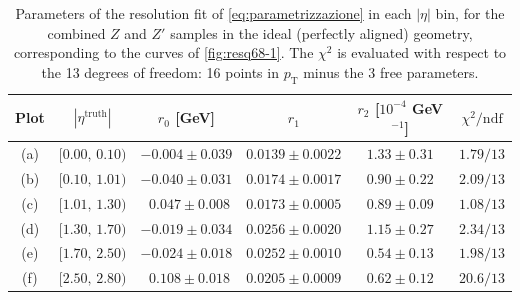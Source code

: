 \documentclass[11pt,a4paper,twoside,openright]{report}
\begin{document}
\begin{table}[htbp]
    \centering
    \begin{tabular}{c c c c c c}
        \toprule
        Plot & $|\eta^{\mathrm{truth}}|$ & $r_0$ [GeV] & $r_1$ & $r_2$ [$10^{-4}$ GeV$^{-1}$] & $\chi^2/\mathrm{ndf}$ \\
        \midrule
        (a) & $[0.00,\,0.10)$ & $-0.004 \pm 0.039$ & $0.0139 \pm 0.0022$ & $1.33 \pm 0.31$ & $1.79/13$ \\
        (b) & $[0.10,\,1.01)$ & $-0.040 \pm 0.031$ & $0.0174 \pm 0.0017$ & $0.90 \pm 0.22$ & $2.09/13$ \\
        (c) & $[1.01,\,1.30)$ & $\ \ 0.047 \pm 0.008$ & $0.0173 \pm 0.0005$ & $0.89 \pm 0.09$ & $1.08/13$ \\
        (d) & $[1.30,\,1.70)$ & $-0.019 \pm 0.034$ & $0.0256 \pm 0.0020$ & $1.15 \pm 0.27$ & $2.34/13$ \\
        (e) & $[1.70,\,2.50)$ & $-0.024 \pm 0.018$ & $0.0252 \pm 0.0010$ & $0.54 \pm 0.13$ & $1.98/13$ \\
        (f) & $[2.50,\,2.80)$ & $\ \ 0.108 \pm 0.018$ & $0.0205 \pm 0.0009$ & $0.62 \pm 0.12$ & $20.6/13$ \\
        \bottomrule
    \end{tabular}
    \caption{Parameters of the resolution fit of \cref{eq:parametrizzazione} in each $|\eta|$ bin, for the combined $Z$ and $Z'$ samples in the ideal (perfectly aligned) geometry, corresponding to the curves of \cref{fig:resq68-1}. The $\chi^2$ is evaluated with respect to the 13 degrees of freedom: 16 points in $p_{\mathrm{T}}$ minus the 3 free parameters.}
    \label{tab:risultati_fit_all}
\end{table}
\end{document}
